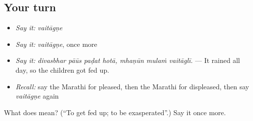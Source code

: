\subsection*{Your turn}
\begin{itemize}
\raggedright
  \item \emph{Say it:} \emph{vaitāgṇe}
  \item \emph{Say it:} \emph{vaitāgṇe}, once more
  \item \emph{Say it:} \emph{divasbhar pāūs paḍat hotā, mhaṇūn mulaṁ vaitāglī.} — It rained all day, so the children got fed up.
  \item \emph{Recall:} say the Marathi for pleased, then the Marathi for displeased, then say \emph{vaitāgṇe} again
\end{itemize}

\begin{tcolorbox}[breakable,colback=teal!4,colframe=teal!35!black,title={Before you move on}]
What does  mean? (\textquotedblleft{}To get fed up; to be exasperated\textquotedblright{}.) Say it once more.
\end{tcolorbox}
